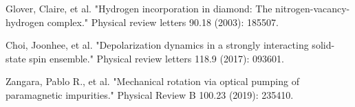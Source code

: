 \documentclass[aps,twocolumn,showpacs]{revtex4-1}
\begin{document}
\maketitle

\begin{thebibliography}{}

 Glover, Claire, et al. "Hydrogen incorporation in diamond: The nitrogen-vacancy-hydrogen complex." Physical review letters 90.18 (2003): 185507.

 Choi, Joonhee, et al. "Depolarization dynamics in a strongly interacting solid-state spin ensemble." Physical review letters 118.9 (2017): 093601.

 Zangara, Pablo R., et al. "Mechanical rotation via optical pumping of paramagnetic impurities." Physical Review B 100.23 (2019): 235410.

\end{thebibliography}
\end{document}
